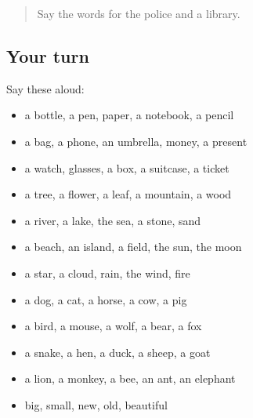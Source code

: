 \label{lesson:IT-R84-first-pass-things-nature-and-animals}



\begin{quote}
Say the words for the police and a library.
\end{quote}

\subsection*{Your turn}
Say these aloud:

\begin{itemize}
\raggedright
  \item a bottle, a pen, paper, a notebook, a pencil
  \item a bag, a phone, an umbrella, money, a present
  \item a watch, glasses, a box, a suitcase, a ticket
  \item a tree, a flower, a leaf, a mountain, a wood
  \item a river, a lake, the sea, a stone, sand
  \item a beach, an island, a field, the sun, the moon
  \item a star, a cloud, rain, the wind, fire
  \item a dog, a cat, a horse, a cow, a pig
  \item a bird, a mouse, a wolf, a bear, a fox
  \item a snake, a hen, a duck, a sheep, a goat
  \item a lion, a monkey, a bee, an ant, an elephant
  \item big, small, new, old, beautiful
\end{itemize}

